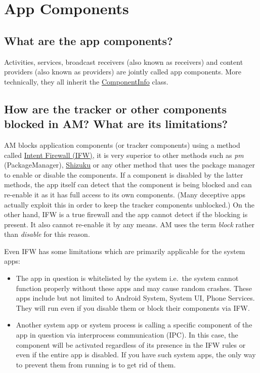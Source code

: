 \section{App Components}\label{sec:faq:app-components} %

\subsection{What are the app components?}\label{subsec:faq:what-are-app-components} %
Activities, services, broadcast receivers (also known as receivers) and content providers (also known as providers) are
jointly called app components. More technically, they all inherit the
\href{https://developer.android.com/reference/android/content/pm/ComponentInfo}{ComponentInfo} class.

\subsection{How are the tracker or other components blocked in AM? What are its limitations?} %
AM blocks application components (or tracker components) using a method called
\href{https://carteryagemann.com/pages/android-intent-firewall.html}{Intent Firewall (IFW)}, it is very superior to
other methods such as \textit{pm} (PackageManager), \href{https://github.com/RikkaApps/Shizuku}{Shizuku} or any other
method that uses the package manager to enable or disable the components. If a component is disabled by the latter
methods, the app itself can detect that the component is being blocked and can re-enable it as it has full access to its
own components. (Many deceptive apps actually exploit this in order to keep the tracker components unblocked.) On the
other hand, IFW is a true firewall and the app cannot detect if the blocking is present. It also cannot re-enable it by
any means. AM uses the term \textit{block} rather than \textit{disable} for this reason.

Even IFW has some limitations which are primarily applicable for the system apps:
\begin{itemize}
    \item The app in question is whitelisted by the system i.e.\ the system cannot function properly without these apps
    and may cause random crashes. These apps include but not limited to Android System, System UI, Phone Services. They
    will run even if you disable them or block their components via IFW\@.

    \item Another system app or system process is calling a specific component of the app in question via interprocess
    communication (IPC). In this case, the component will be activated regardless of its presence in the IFW rules or
    even if the entire app is disabled. If you have such system apps, the only way to prevent them from running is to
    get rid of them.
\end{itemize}

